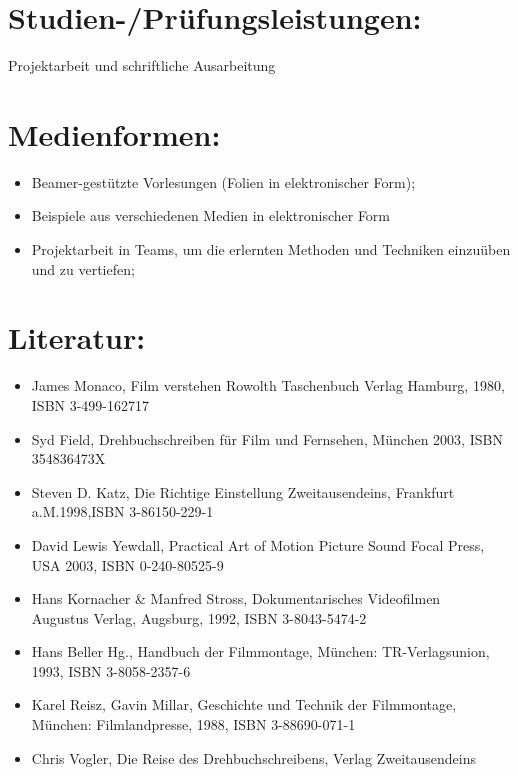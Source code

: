 \section{Studien-/Prüfungsleistungen:}\label{studien-pruxfcfungsleistungen-2}

Projektarbeit und schriftliche Ausarbeitung

\section{Medienformen:}\label{medienformen-2}

\begin{itemize}
\tightlist
\item
  Beamer-gestützte Vorlesungen (Folien in elektronischer Form);
\item
  Beispiele aus verschiedenen Medien in elektronischer Form
\item
  Projektarbeit in Teams, um die erlernten Methoden und Techniken
  einzuüben und zu vertiefen;
\end{itemize}

\section{Literatur:}\label{literatur-2}

\begin{itemize}
\tightlist
\item
  James Monaco, Film verstehen Rowolth Taschenbuch Verlag Hamburg, 1980,
  ISBN 3-499-162717
\item
  Syd Field, Drehbuchschreiben für Film und Fernsehen, München 2003,
  ISBN 354836473X
\item
  Steven D. Katz, Die Richtige Einstellung Zweitausendeins, Frankfurt
  a.M.1998,ISBN 3-86150-229-1
\item
  David Lewis Yewdall, Practical Art of Motion Picture Sound Focal
  Press, USA 2003, ISBN 0-240-80525-9
\item
  Hans Kornacher \& Manfred Stross, Dokumentarisches Videofilmen\\
  Augustus Verlag, Augsburg, 1992, ISBN 3-8043-5474-2
\item
  Hans Beller Hg., Handbuch der Filmmontage, München: TR-Verlagsunion,
  1993, ISBN 3-8058-2357-6
\item
  Karel Reisz, Gavin Millar, Geschichte und Technik der Filmmontage,
  München: Filmlandpresse, 1988, ISBN 3-88690-071-1
\item
  Chris Vogler, Die Reise des Drehbuchschreibens, Verlag Zweitausendeins
\end{itemize}

